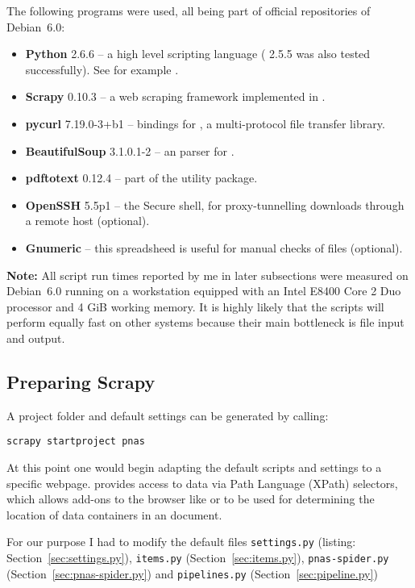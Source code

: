 The following programs were used, all being part of official repositories of Debian~6.0:
\begin{itemize}
 \item \textbf{Python} 2.6.6 -- a high level scripting language ( 2.5.5 was also tested successfully). See for example \cite{Ascher2005}.
 \item \textbf{Scrapy} 0.10.3 -- a web scraping framework implemented in .
 \item \textbf{pycurl} 7.19.0-3+b1 --  bindings for , a multi-protocol file transfer library.
 \item \textbf{BeautifulSoup} 3.1.0.1-2 -- an  parser for .
 \item \textbf{pdftotext} 0.12.4 -- part of the   utility package.
 \item \textbf{OpenSSH} 5.5p1 -- the Secure shell, for proxy-tunnelling downloads through a remote host \citep{Barrett2001} (optional).
 \item \textbf{Gnumeric} -- this spreadsheed is useful for manual checks of  files (optional).
\end{itemize}

\textbf{Note:} All script run times reported by me in later subsections were measured on Debian~6.0 running on a workstation equipped with an Intel E8400 Core 2 Duo processor and 4 GiB working memory. It is highly likely that the scripts will perform equally fast on other systems because their main bottleneck is file input and output.

\subsection{Preparing Scrapy}
A project folder and default settings can be generated by calling:
\begin{verbatim}
scrapy startproject pnas
\end{verbatim}
At this point one would begin adapting the default scripts and settings to a specific webpage.  provides access to  data via  Path Language (XPath) selectors, which allows add-ons to the  browser like  or  to be used for determining the location of data containers in an  document.

For our purpose I had to modify the default  files \texttt{settings.py} (listing: Section~\ref{sec:settings.py}), \texttt{items.py} (Section~\ref{sec:items.py}), \texttt{pnas-spider.py} (Section~\ref{sec:pnas-spider.py}) and \texttt{pipelines.py} (Section~\ref{sec:pipeline.py})

